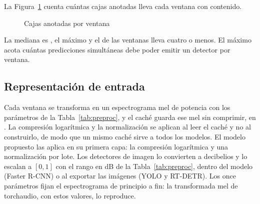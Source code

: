  La Figura~\ref{fig:densidad} cuenta
cuántas cajas anotadas lleva cada ventana con contenido.

\begin{figure}[htbp]
    \centering
    \caption{Cajas anotadas por ventana}
    \label{fig:densidad}
\end{figure}

La mediana es \medianPerWindow{}, el máximo \maxPerWindow{} y el \pctLeqFour{} de
las ventanas lleva cuatro o menos. El máximo acota
cuántas predicciones simultáneas debe poder emitir un detector por ventana.

\subsection{Representación de entrada}
\label{sec:representacion}

 Cada ventana se transforma en un espectrograma
mel de potencia con los parámetros de la Tabla~\ref{tab:preproc}, y el caché
guarda ese mel sin comprimir, en . La compresión logarítmica y la
normalización se aplican al leer el caché y no al construirlo, de modo que un
mismo caché sirve a todos los modelos. El modelo propuesto las aplica en su
primera capa: la compresión logarítmica y una normalización por lote. Los detectores de
imagen lo convierten a decibelios y lo escalan a $[0, 1]$ con el rango en dB de la
Tabla~\ref{tab:preproc}, dentro del modelo (Faster R-CNN) o al exportar las
imágenes (YOLO y RT-DETR). Los
once parámetros fijan el espectrograma de principio a fin: la transformada mel
de torchaudio, con estos valores, lo reproduce.

